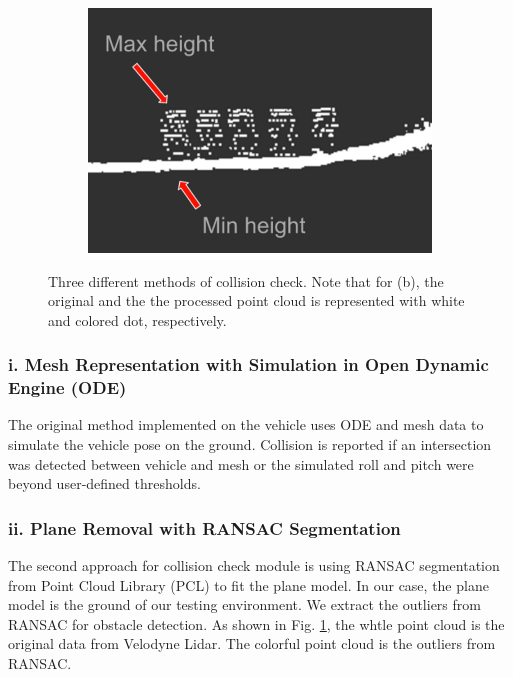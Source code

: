 \documentclass[../thesis.tex]{subfiles}
\begin{document}
\begin{figure}[t]
\begin{subfigure}[b]{0.3\linewidth}
		\label{fig:collision_ransac}
	\end{subfigure}
	\begin{subfigure}[b]{0.3\linewidth}
		\includegraphics[width=\columnwidth]{./RRTPlanner/fig/height_map.png}
		\label{fig:collision_height_map}
	\end{subfigure}
	\caption{Three different methods of collision check. Note that for (b), the original and the the processed point cloud is represented with white and colored dot, respectively.}
    \label{fig:collision}
\end{figure}


\subsubsection{i. Mesh Representation with Simulation in Open Dynamic Engine (ODE)}
The original method implemented on the vehicle uses ODE and mesh data to simulate the vehicle pose on the ground. Collision is reported if an intersection was detected between vehicle and mesh or the simulated roll and pitch were beyond user-defined thresholds. 

\subsubsection{ii. Plane Removal with RANSAC Segmentation}
The second approach for collision check module is using RANSAC segmentation from Point Cloud Library (PCL) to fit the plane model. In our case, the plane model is the ground of our testing environment. We extract the outliers from RANSAC for obstacle detection. As shown in Fig. \ref{fig:collision_ransac}, the whtle point cloud is the original data from Velodyne Lidar. The colorful point cloud is the outliers from RANSAC. 
\end{document}
